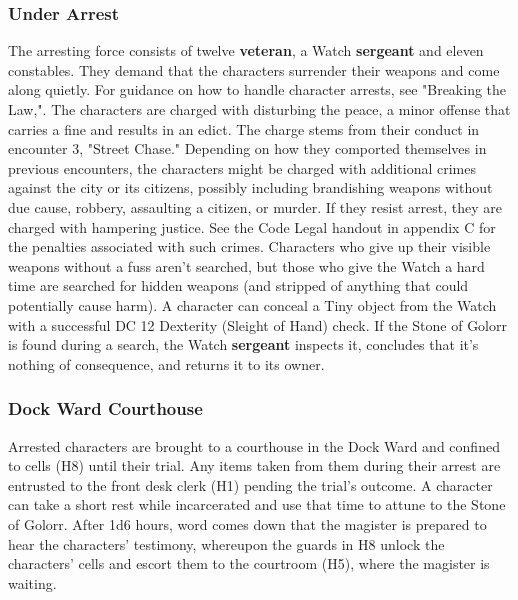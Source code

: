 \documentclass[10pt,a4paper,twoside,twocolumn,openany,nodeprecatedcode]{dndbook}
\begin{document}
\subsubsection{Under Arrest}
The arresting force consists of twelve \textbf{veteran}, a Watch \textbf{sergeant} and eleven constables. They demand that the characters surrender their weapons and come along quietly. For guidance on how to handle character arrests, see "Breaking the Law,".
The characters are charged with disturbing the peace, a minor offense that carries a fine and results in an edict. The charge stems from their conduct in encounter 3, "Street Chase." Depending on how they comported themselves in previous encounters, the characters might be charged with additional crimes against the city or its citizens, possibly including brandishing weapons without due cause, robbery, assaulting a citizen, or murder. If they resist arrest, they are charged with hampering justice. See the Code Legal handout in appendix C for the penalties associated with such crimes.
Characters who give up their visible weapons without a fuss aren't searched, but those who give the Watch a hard time are searched for hidden weapons (and stripped of anything that could potentially cause harm). A character can conceal a Tiny object from the Watch with a successful DC 12 Dexterity (Sleight of Hand) check. If the Stone of Golorr is found during a search, the Watch \textbf{sergeant} inspects it, concludes that it's nothing of consequence, and returns it to its owner.
\subsubsection{Dock Ward Courthouse}
Arrested characters are brought to a courthouse in the Dock Ward and confined to cells (H8) until their trial. Any items taken from them during their arrest are entrusted to the front desk clerk (H1) pending the trial's outcome. A character can take a short rest while incarcerated and use that time to attune to the Stone of Golorr. After 1d6 hours, word comes down that the magister is prepared to hear the characters' testimony, whereupon the guards in H8 unlock the characters' cells and escort them to the courtroom (H5), where the magister is waiting.
\end{document}
